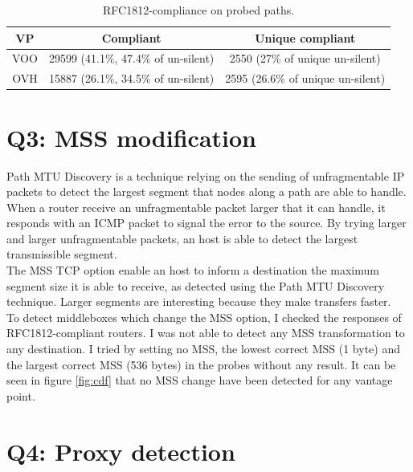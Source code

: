 \documentclass[journal]{IEEEtran}
\begin{document}
\begin{table}[h]
    \begin{center}
        \begin{tabular}{ | c | c | c | }
            \hline
            VP   & Compliant                           & Unique compliant \\ \hline
            VOO  & 29599 (41.1\%, 47.4\% of un-silent) & 2550 (27\% of unique un-silent)          \\ \hline
            OVH  & 15887 (26.1\%, 34.5\% of un-silent) & 2595 (26.6\% of unique un-silent)         \\
            \hline
        \end{tabular}
    \end{center}
    \caption{RFC1812-compliance on probed paths.}
    \label{tab:RFC1812}
\end{table}

\section{Q3: MSS modification}

Path MTU Discovery is a technique relying on the sending of unfragmentable IP packets to detect the largest segment that nodes along a path are able to handle. When a router receive an unfragmentable packet larger that it can handle, it responds with an ICMP packet to signal the error to the source. By trying larger and larger unfragmentable packets, an host is able to detect the largest transmissible segment. \\
The MSS TCP option enable an host to inform a destination the maximum segment size it is able to receive, as detected using the Path MTU Discovery technique. Larger segments are interesting because they make transfers faster. \\
To detect middleboxes which change the MSS option, I checked the responses of RFC1812-compliant routers. I was not able to detect any MSS transformation to any destination. I tried by setting no MSS, the lowest correct MSS (1 byte) and the largest correct MSS (536 bytes) in the probes without any result.
It can be seen in figure \ref{fig:cdf} that no MSS change have been detected for any vantage point.

\section{Q4: Proxy detection}
\end{document}
